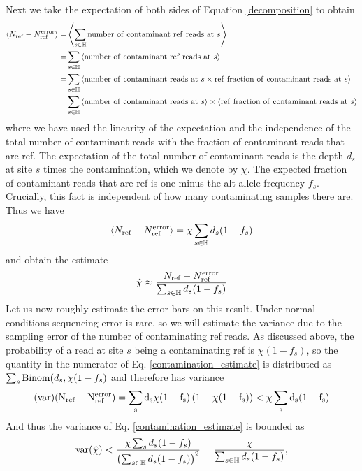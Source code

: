 \documentclass[nofootinbib,amssymb,amsmath]{revtex4}
\newcommand{\ave}[1]{\left\langle #1 \right\rangle}
\begin{document}
Next we take the expectation of both sides of Equation \ref{decomposition} to obtain
\begin{align}
\ave{N_{\rm ref} - N_{\rm ref}^{\rm error}} =& \ave{\sum_{s \in \mathbb{H}} {\rm number~of~contaminant~ref~reads~at~}s} \\
=& \sum_{s \in \mathbb{H}} \ave{{\rm number~of~contaminant~ref~reads~at~}s} \\
=& \sum_{s \in \mathbb{H}} \ave{{\rm number~of~contaminant~reads~at~}s \times {\rm ref~fraction~of~contaminant~reads~at~}s} \\
=& \sum_{s \in \mathbb{H}} \ave{{\rm number~of~contaminant~reads~at~}s} \times \ave{{\rm ref~fraction~of~contaminant~reads~at~}s}
\end{align}
where we have used the linearity of the expectation and the independence of the total number of contaminant reads with the fraction of contaminant reads that are ref.  The expectation of the total number of contaminant reads is the depth $d_s$ at site $s$ times the contamination, which we denote by $\chi$.  The expected fraction of contaminant reads that are ref is one minus the alt allele frequency $f_s$.  Crucially, this fact is independent of how many contaminating samples there are.  Thus we have
\begin{align}
\ave{N_{\rm ref} - N_{\rm ref}^{\rm error}} = \chi \sum_{s \in \mathbb{H}} d_s (1 - f_s)
\end{align}
and obtain the estimate
\begin{align}
\hat{\chi} \approx \frac{N_{\rm ref} - N_{\rm ref}^{\rm error}}{\sum_{s \in \mathbb{H}} d_s (1 - f_s)} \label{contamination_estimate}
\end{align}
Let us now roughly estimate the error bars on this result.  Under normal conditions sequencing error is rare, so we will estimate the variance due to the sampling error of the number of contaminating ref reads.  As discussed above, the probability of a read at site $s$ being a contaminating ref is $\chi (1 - f_s)$, so the quantity in the numerator of Eq. \ref{contamination_estimate} is distributed as $\sum_s {\rm Binom}(d_s, \chi (1 - f_s)$ and therefore has variance
\begin{equation}
\rm(var)(N_{\rm ref} - N_{\rm ref}^{\rm error}) = \sum_s d_s \chi (1 - f_s) \left( 1 - \chi (1 - f_s) \right) < \chi \sum_s d_s  (1 - f_s)
\end{equation}
And thus the variance of Eq. \ref{contamination_estimate} is bounded as
\begin{equation}
{\rm var}(\hat{\chi}) < \frac{ \chi \sum_s d_s  (1 - f_s) }{ \left( \sum_{s \in \mathbb{H}} d_s (1 - f_s) \right)^2} = \frac{ \chi }{  \sum_{s \in \mathbb{H}} d_s (1 - f_s) },
\end{equation}
\end{document}
